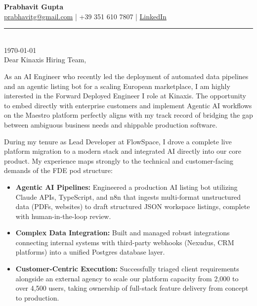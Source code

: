 \documentclass[11pt,a4paper]{article}
\begin{document}
{\Large \textbf{Prabhavit Gupta}} \\[1ex]
\href{mailto:prabhavitg@gmail.com}{prabhavitg@gmail.com} | +39 351 610 7807 | \href{https://www.linkedin.com/in/prabhavit/}{LinkedIn} \\[2ex]
\noindent\rule{\textwidth}{0.4pt} \\[2ex]


\today \\[2ex]

Dear Kinaxis Hiring Team,


As an AI Engineer who recently led the deployment of automated data pipelines and an agentic listing bot for a scaling European marketplace, I am highly interested in the Forward Deployed Engineer I role at Kinaxis. The opportunity to embed directly with enterprise customers and implement Agentic AI workflows on the Maestro platform perfectly aligns with my track record of bridging the gap between ambiguous business needs and shippable production software.


During my tenure as Lead Developer at FlowSpace, I drove a complete live platform migration to a modern stack and integrated AI directly into our core product. My experience maps strongly to the technical and customer-facing demands of the FDE pod structure:


\begin{itemize}
    \item \textbf{Agentic AI Pipelines:} Engineered a production AI listing bot utilizing Claude APIs, TypeScript, and n8n that ingests multi-format unstructured data (PDFs, websites) to draft structured JSON workspace listings, complete with human-in-the-loop review.
    \item \textbf{Complex Data Integration:} Built and managed robust integrations connecting internal systems with third-party webhooks (Nexudus, CRM platforms) into a unified Postgres database layer.
    \item \textbf{Customer-Centric Execution:} Successfully triaged client requirements alongside an external agency to scale our platform capacity from 2,000 to over 4,500 users, taking ownership of full-stack feature delivery from concept to production.
\end{itemize}
\vspace{6pt}
\end{document}
